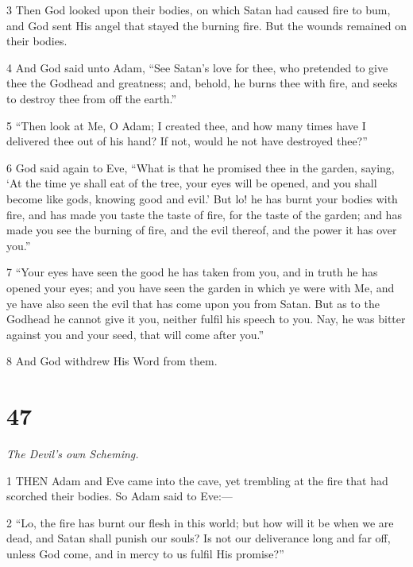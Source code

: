 \par 3 Then God looked upon their bodies, on which Satan had caused fire to bum, and God sent His angel that stayed the burning fire. But the wounds remained on their bodies.

\par 4 And God said unto Adam, “See Satan's love for thee, who pretended to give thee the Godhead and greatness; and, behold, he burns thee with fire, and seeks to destroy thee from off the earth.”

\par 5 “Then look at Me, O Adam; I created thee, and how many times have I delivered thee out of his hand? If not, would he not have destroyed thee?”

\par 6 God said again to Eve, “What is that he promised thee in the garden, saying, ‘At the time ye shall eat of the tree, your eyes will be opened, and you shall become like gods, knowing good and evil.’ But lo! he has burnt your bodies with fire, and has made you taste the taste of fire, for the taste of the garden; and has made you see the burning of fire, and the evil thereof, and the power it has over you.”

\par 7 “Your eyes have seen the good he has taken from you, and in truth he has opened your eyes; and you have seen the garden in which ye were with Me, and ye have also seen the evil that has come upon you from Satan. But as to the Godhead he cannot give it you, neither fulfil his speech to you. Nay, he was bitter against you and your seed, that will come after you.”

\par 8 And God withdrew His Word from them.

\chapter{47}

\par \textit{The Devil's own Scheming.}

\par 1 THEN Adam and Eve came into the cave, yet trembling at the fire that had scorched their bodies. So Adam said to Eve:—

\par 2 “Lo, the fire has burnt our flesh in this world; but how will it be when we are dead, and Satan shall punish our souls? Is not our deliverance long and far off, unless God come, and in mercy to us fulfil His promise?”


